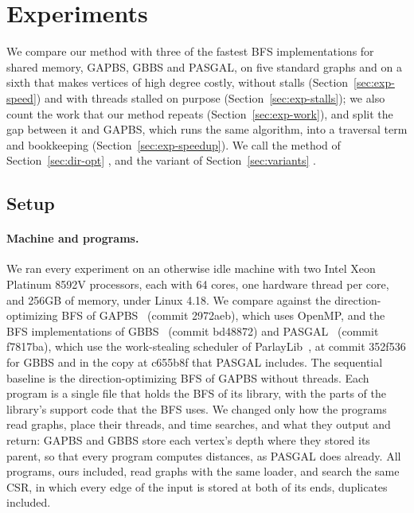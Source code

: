\section{Experiments}
\label{sec:experiments}

We compare our method with three of the fastest BFS implementations for shared memory, GAPBS, GBBS and PASGAL, on five standard graphs and on a sixth that makes vertices of high degree costly, without stalls (Section~\ref{sec:exp-speed}) and with threads stalled on purpose (Section~\ref{sec:exp-stalls}); we also count the work that our method repeats (Section~\ref{sec:exp-work}), and split the gap between it and GAPBS, which runs the same algorithm, into a traversal term and bookkeeping (Section~\ref{sec:exp-speedup}). We call the method of Section~\ref{sec:dir-opt} \wfdo, and the variant of Section~\ref{sec:variants} \wfdomem.

\subsection{Setup}
\label{sec:exp-setup}

\paragraph{Machine and programs.} We ran every experiment on an otherwise idle machine with two Intel Xeon Platinum 8592V processors, each with 64 cores, one hardware thread per core, and 256GB of memory, under Linux 4.18. We compare against the direction-optimizing BFS of GAPBS~\cite{gapbs} (commit 2972aeb), which uses OpenMP, and the BFS implementations of GBBS~\cite{gbbs} (commit bd48872) and PASGAL~\cite{pasgal} (commit f7817ba), which use the work-stealing scheduler of ParlayLib~\cite{parlaylib}, at commit 352f536 for GBBS and in the copy at c655b8f that PASGAL includes. The sequential baseline is the direction-optimizing BFS of GAPBS without threads. Each program is a single file that holds the BFS of its library, with the parts of the library's support code that the BFS uses. We changed only how the programs read graphs, place their threads, and time searches, and what they output and return: GAPBS and GBBS store each vertex's depth where they stored its parent, so that every program computes distances, as PASGAL does already. All programs, ours included, read graphs with the same loader, and search the same CSR, in which every edge of the input is stored at both of its ends, duplicates included.

